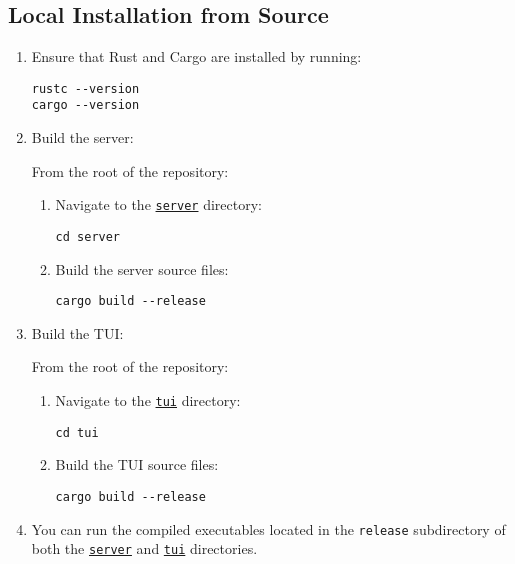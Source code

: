\subsection{Local Installation from Source}
\label{sec:source}

\begin{enumerate}
    \item Ensure that Rust and Cargo are installed by running:
    
    \begin{lstlisting}
rustc --version
cargo --version
    \end{lstlisting}
    
    \item Build the server:
    
    From the root of the repository:
    
    \begin{enumerate}
        \item Navigate to the \href{https://github.com/christiansassi/advanced-programming-of-cryptographic-methods-project/tree/main/server}{\texttt{server}} directory:
        
        \begin{lstlisting}
cd server
        \end{lstlisting}
        
        \item Build the server source files:
        
        \begin{lstlisting}
cargo build --release
        \end{lstlisting}
    \end{enumerate}
    
    \item Build the TUI:
    
    From the root of the repository:
    
    \begin{enumerate}
        \item Navigate to the \href{https://github.com/christiansassi/advanced-programming-of-cryptographic-methods-project/tree/main/tui}{\texttt{tui}} directory:
        
        \begin{lstlisting}
cd tui
        \end{lstlisting}
        
        \item Build the TUI source files:
        
        \begin{lstlisting}
cargo build --release
        \end{lstlisting}
    \end{enumerate}
    
    \item You can run the compiled executables located in the \texttt{release} subdirectory of both the \href{https://github.com/christiansassi/advanced-programming-of-cryptographic-methods-project/tree/main/server/target/release}{\texttt{server}} and \href{https://github.com/christiansassi/advanced-programming-of-cryptographic-methods-project/tree/main/tui/target/release}{\texttt{tui}} directories.
\end{enumerate}

